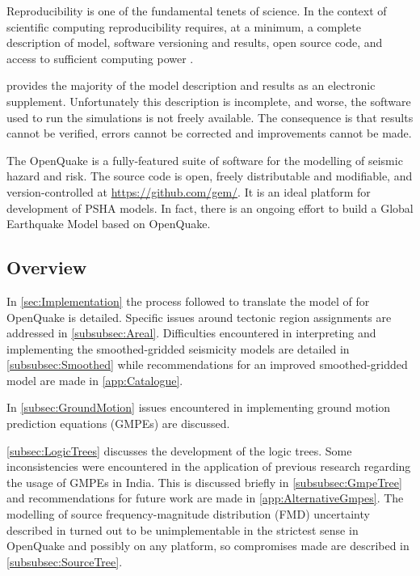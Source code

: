 \documentclass{article}
\begin{document}
Reproducibility is one of the fundamental tenets of science.
In the context of scientific computing reproducibility requires, at a minimum, a complete description of model, software versioning and results, open source code, and access to sufficient computing power \citep{hinsen2011data}.

\cite{nath2012probabilistic} provides the majority of the model description and results as an electronic supplement.
Unfortunately this description is incomplete, and worse, the software used to run the simulations is not freely available.
The consequence is that results cannot be verified, errors cannot be corrected and improvements cannot be made.

The OpenQuake \citep{crowley2015openquake} is a fully-featured suite of software for the modelling of seismic hazard and risk.
The source code is open, freely distributable and modifiable, and version-controlled at \url{https://github.com/gem/}.
It is an ideal platform for development of PSHA models.
In fact, there is an ongoing effort to build a Global Earthquake Model based on OpenQuake.

\subsection{Overview}
\label{subsec:Overview}

In \autoref{sec:Implementation} the process followed to translate the model of \cite{nath2012probabilistic} for OpenQuake is detailed.
Specific issues around tectonic region assignments are addressed in \autoref{subsubsec:Areal}.
Difficulties encountered in interpreting and implementing the smoothed-gridded seismicity models are detailed in \autoref{subsubsec:Smoothed} while recommendations for an improved smoothed-gridded model are made in \autoref{app:Catalogue}.

In \autoref{subsec:GroundMotion} issues encountered in implementing ground motion prediction equations (GMPEs) are discussed.

\autoref{subsec:LogicTrees} discusses the development of the logic trees.
Some inconsistencies were encountered in the application of previous research regarding the usage of GMPEs in India.
This is discussed briefly in \autoref{subsubsec:GmpeTree} and recommendations for future work are made in \autoref{app:AlternativeGmpes}.
The modelling of source frequency-magnitude distribution (FMD) uncertainty described in \cite{nath2012probabilistic} turned out to be unimplementable in the strictest sense in OpenQuake and possibly on any platform, so compromises made are described in \autoref{subsubsec:SourceTree}.
\end{document}
